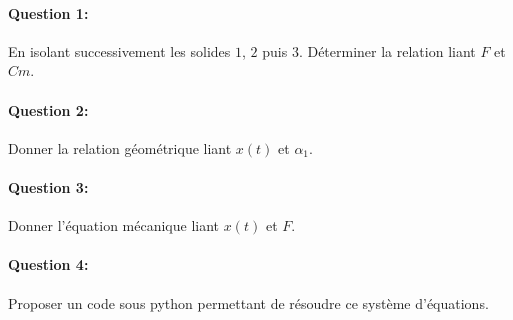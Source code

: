 \paragraph{Question 1:} En isolant successivement les solides $1$, $2$ puis $3$. Déterminer la relation liant $F$ et $Cm$.

\paragraph{Question 2:} Donner la relation géométrique liant $x(t)$ et $\alpha_1$.

\paragraph{Question 3:} Donner l'équation mécanique liant $x(t)$ et $F$.

\paragraph{Question 4:} Proposer un code sous python permettant de résoudre ce système d'équations.


